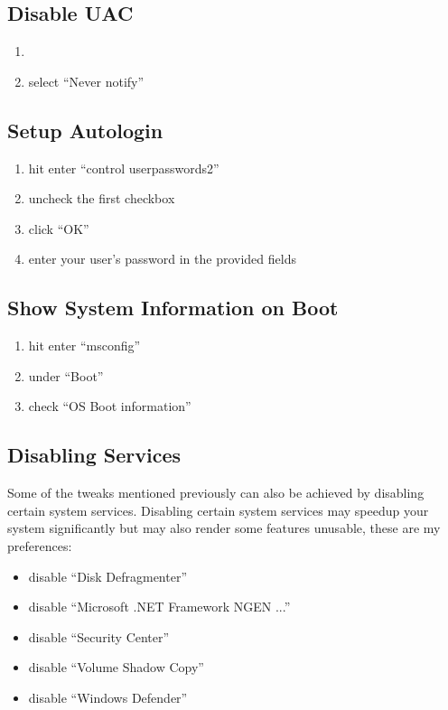 \documentclass{itsarticle}
\begin{document}
\subsection{Disable UAC}
\label{sub:disable_uac}

\begin{enumerate}
    \item {}
    \item select ``Never notify''
\end{enumerate}

\subsection{Setup Autologin}
\label{sub:setup_autologin}

\begin{enumerate}
    \item hit  enter ``control userpasswords2''
    \item uncheck the first checkbox
    \item click ``OK''
    \item enter your user's password in the provided fields
\end{enumerate}

\subsection{Show System Information on Boot}
\label{sub:show_system_information_on_boot}

\begin{enumerate}
    \item hit  enter ``msconfig''
    \item under ``Boot''
    \item check ``OS Boot information''
\end{enumerate}

\subsection{Disabling Services}
\label{sub:services}

Some of the tweaks mentioned previously can also be achieved by disabling
certain system services. Disabling certain system services may speedup your
system significantly but may also render some features unusable, these are my
preferences:

\begin{itemize}
    \item disable ``Disk Defragmenter''
    \item disable ``Microsoft .NET Framework NGEN ...''
    \item disable ``Security Center''
    \item disable ``Volume Shadow Copy''
    \item disable ``Windows Defender''
\end{itemize}
\end{document}
